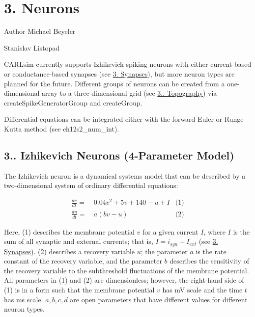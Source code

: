 \hypertarget{ch3_neurons_synapses_groups_ch3s1_neurons}{}\section{3. Neurons}\label{ch3_neurons_synapses_groups_ch3s1_neurons}
\begin{DoxyAuthor}{Author}
Michael Beyeler 

Stanislav Listopad
\end{DoxyAuthor}
C\+A\+R\+Lsim currently supports Izhikevich spiking neurons with either current-\/based or conductance-\/based synapses (see \hyperlink{ch3_neurons_synapses_groups_ch3s2_synapses}{3. Synapses}), but more neuron types are planned for the future. Different groups of neurons can be created from a one-\/dimensional array to a three-\/dimensional grid (see \hyperlink{ch3_neurons_synapses_groups_ch3s3s2_topography}{3.. Topography}) via {\ttfamily create\+Spike\+Generator\+Group} and {\ttfamily create\+Group}.

Differential equations can be integrated either with the forward Euler or Runge-\/\+Kutta method (see ch12s2\+\_\+num\+\_\+int).\hypertarget{ch3_neurons_synapses_groups_ch3s1s1_izhikevich_neurons4}{}\subsection{3.. Izhikevich Neurons (4-\/\+Parameter Model)}\label{ch3_neurons_synapses_groups_ch3s1s1_izhikevich_neurons4}
The Izhikevich neuron is a dynamical systems model that can be described by a two-\/dimensional system of ordinary differential equations\+:

\begin{align*} \frac{dv}{dt} = & ~ 0.04v^2 + 5v + 140 - u + I & \text{(1)}\\ \frac{du}{dt} = & ~ a (bv - u) & \text{(2)} \end{align*}

Here, (1) describes the membrane potential $v$ for a given current $I$, where $I$ is the sum of all synaptic and external currents; that is, $I = i_{syn} + I_{ext}$ (see \hyperlink{ch3_neurons_synapses_groups_ch3s2_synapses}{3. Synapses}). (2) describes a recovery variable $u$; the parameter $a$ is the rate constant of the recovery variable, and the parameter $b$ describes the sensitivity of the recovery variable to the subthreshold fluctuations of the membrane potential. All parameters in (1) and (2) are dimensionless; however, the right-\/hand side of (1) is in a form such that the membrane potential $v$ has mV scale and the time $t$ has ms scale. $a, b, c, d$ are open parameters that have different values for different neuron types.

